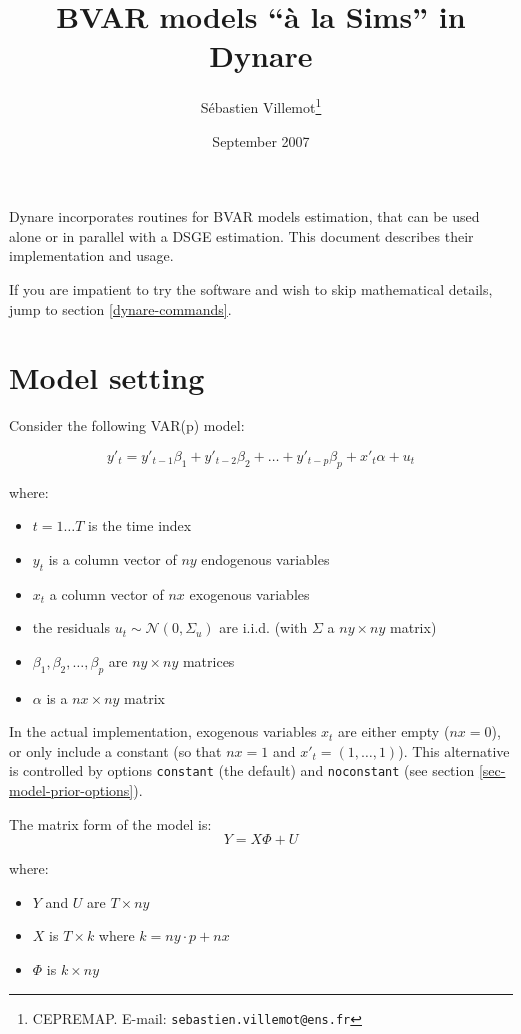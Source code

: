 \documentclass[10pt,a4paper]{article}
\begin{document}
\title{BVAR models ``\`a la Sims'' in Dynare}
\author{S\'ebastien Villemot\thanks{CEPREMAP. E-mail: \texttt{sebastien.villemot@ens.fr}}}
\date{September 2007}

\maketitle

Dynare incorporates routines for BVAR models estimation, that can be used alone or in parallel with a DSGE estimation.
This document describes their implementation and usage.

If you are impatient to try the software and wish to skip mathematical details, jump to section \ref{dynare-commands}.

\section{Model setting}

Consider the following VAR(p) model:

$$y'_t = y'_{t-1}\beta_1 + y'_{t-2}\beta_2 + \ldots + y'_{t-p}\beta_p + x'_t\alpha + u_t$$

where:
\begin{itemize}
\item $t = 1\ldots T$ is the time index
\item $y_t$ is a column vector of $ny$ endogenous variables
\item $x_t$ a column vector of $nx$ exogenous variables
\item the residuals $u_t \sim \mathcal{N}(0, \Sigma_u)$ are i.i.d. (with $\Sigma$ a $ny\times ny$ matrix)
\item $\beta_1,\beta_2,\ldots,\beta_p$ are $ny\times ny$ matrices
\item $\alpha$ is a $nx\times ny$ matrix
\end{itemize}

In the actual implementation, exogenous variables $x_t$ are either empty ($nx = 0$), or only include a constant (so that $nx = 1$ and $x'_t = (1, \ldots, 1)$). This alternative is controlled by options \texttt{constant} (the default) and \texttt{noconstant} (see section \ref{sec-model-prior-options}).

The matrix form of the model is:
$$Y = X\Phi + U$$

where:
\begin{itemize}
\item $Y$ and $U$ are $T\times ny$
\item $X$ is $T\times k$ where $k = ny\cdot p + nx$
\item $\Phi$ is $k \times ny$
\end{itemize}
\end{document}

